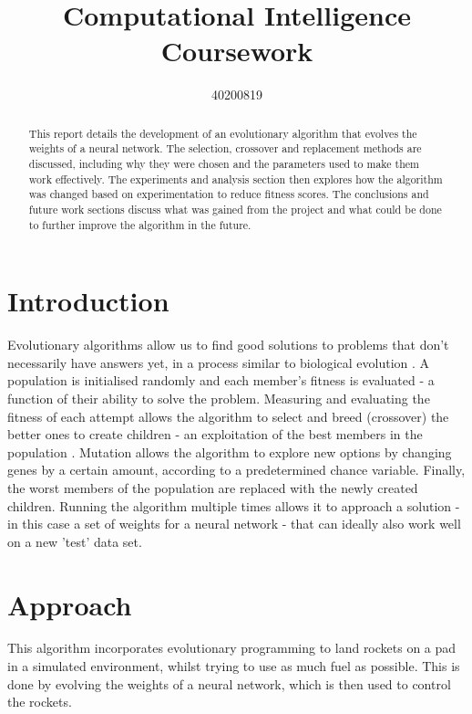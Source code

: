 \documentclass[sigconf]{acmart}
\begin{document}
\title{Computational Intelligence Coursework}

\author{40200819}



\begin{abstract}
This report details the development of an evolutionary algorithm that evolves the weights of a neural network. The selection, crossover and replacement methods are discussed, including why they were chosen and the parameters used to make them work effectively. The experiments and analysis section then explores how the algorithm was changed based on experimentation to reduce fitness scores. The conclusions and future work sections discuss what was gained from the project and what could be done to further improve the algorithm in the future.
\end{abstract}





\maketitle

\section{Introduction}
Evolutionary algorithms allow us to find good solutions to problems that don't necessarily have answers yet, in a process similar to biological evolution \cite{evoAlgIntro}. A population is initialised randomly and each member's fitness is evaluated - a function of their ability to solve the problem. Measuring and evaluating the fitness of each attempt allows the algorithm to select and breed (crossover) the better ones to create children - an exploitation of the best members in the population \cite{exploreExploit}. Mutation allows the algorithm to explore new options by changing genes by a certain amount, according to a predetermined chance variable. Finally, the worst members of the population are replaced with the newly created children. Running the algorithm multiple times allows it to approach a solution - in this case a set of weights for a neural network - that can ideally also work well on a new 'test' data set.

\section{Approach}
This algorithm incorporates evolutionary programming to land rockets on a pad in a simulated environment, whilst trying to use as much fuel as possible. This is done by evolving the weights of a neural network, which is then used to control the rockets. 
\end{document}
